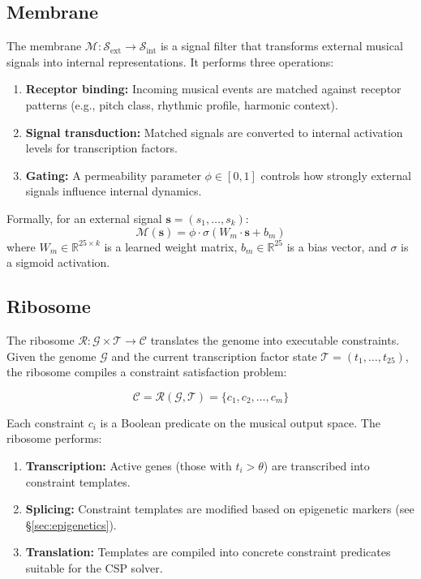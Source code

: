 \documentclass[11pt,a4paper]{article}
\newcommand{\R}{\mathbb{R}}
\newcommand{\calG}{\mathcal{G}}
\newcommand{\calC}{\mathcal{C}}
\begin{document}
\subsection{Membrane}

The membrane $\mathcal{M}: \mathcal{S}_{\text{ext}} \to \mathcal{S}_{\text{int}}$ is a signal filter that transforms external musical signals into internal representations. It performs three operations:

\begin{enumerate}
  \item \textbf{Receptor binding:} Incoming musical events are matched against receptor patterns (e.g., pitch class, rhythmic profile, harmonic context).
  \item \textbf{Signal transduction:} Matched signals are converted to internal activation levels for transcription factors.
  \item \textbf{Gating:} A permeability parameter $\phi \in [0, 1]$ controls how strongly external signals influence internal dynamics.
\end{enumerate}

Formally, for an external signal $\mathbf{s} = (s_1, \ldots, s_k)$:
\begin{equation}
  \mathcal{M}(\mathbf{s}) = \phi \cdot \sigma(W_m \cdot \mathbf{s} + b_m)
\end{equation}
where $W_m \in \R^{25 \times k}$ is a learned weight matrix, $b_m \in \R^{25}$ is a bias vector, and $\sigma$ is a sigmoid activation.

\subsection{Ribosome}

The ribosome $\mathcal{R}: \calG \times \mathcal{T} \to \calC$ translates the genome into executable constraints. Given the genome $\calG$ and the current transcription factor state $\mathcal{T} = (t_1, \ldots, t_{25})$, the ribosome compiles a constraint satisfaction problem:

\begin{equation}
  \calC = \mathcal{R}(\calG, \mathcal{T}) = \{c_1, c_2, \ldots, c_m\}
\end{equation}

Each constraint $c_i$ is a Boolean predicate on the musical output space. The ribosome performs:
\begin{enumerate}
  \item \textbf{Transcription:} Active genes (those with $t_i > \theta$) are transcribed into constraint templates.
  \item \textbf{Splicing:} Constraint templates are modified based on epigenetic markers (see \S\ref{sec:epigenetics}).
  \item \textbf{Translation:} Templates are compiled into concrete constraint predicates suitable for the CSP solver.
\end{enumerate}
\end{document}
